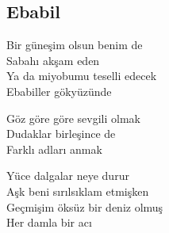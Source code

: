 \subsection{Ebabil}

Bir güneşim olsun benim de \\
Sabahı akşam eden \\
Ya da miyobumu teselli edecek \\
Ebabiller gökyüzünde

\noindent\newline
Göz göre göre sevgili olmak \\
Dudaklar birleşince de \\
Farklı adları anmak

\noindent\newline
Yüce dalgalar neye durur \\
Aşk beni sırılsıklam etmişken \\
Geçmişim öksüz bir deniz olmuş \\
Her damla bir acı